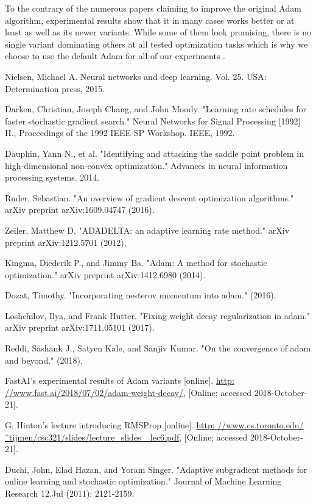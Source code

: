 \documentclass[12pt, titlepage]{article}
\begin{document}
To the contrary of the numerous papers claiming to improve the original Adam algorithm, experimental results show that it in many cases works better or at least as well as its newer variants. While some of them look promising, there is no single variant dominating others at all tested optimization tasks which is why we choose to use the default Adam for all of our experiments \cite{adam-variants}.



\begin{thebibliography}{0}
   Nielsen, Michael A. Neural networks and deep learning. Vol. 25. USA: Determination press, 2015.
  
   Darken, Christian, Joseph Chang, and John Moody. "Learning rate schedules for faster stochastic gradient search." Neural Networks for Signal Processing [1992] II., Proceedings of the 1992 IEEE-SP Workshop. IEEE, 1992.
  
   Dauphin, Yann N., et al. "Identifying and attacking the saddle point problem in high-dimensional non-convex optimization." Advances in neural information processing systems. 2014.
  
   Ruder, Sebastian. "An overview of gradient descent optimization algorithms." arXiv preprint arXiv:1609.04747 (2016).
  
   Zeiler, Matthew D. "ADADELTA: an adaptive learning rate method." arXiv preprint arXiv:1212.5701 (2012).
  
   Kingma, Diederik P., and Jimmy Ba. "Adam: A method for stochastic optimization." arXiv preprint arXiv:1412.6980 (2014).
  
   Dozat, Timothy. "Incorporating nesterov momentum into adam." (2016).
  
   Loshchilov, Ilya, and Frank Hutter. "Fixing weight decay regularization in adam." arXiv preprint arXiv:1711.05101 (2017).
  
   Reddi, Sashank J., Satyen Kale, and Sanjiv Kumar. "On the convergence of adam and beyond." (2018).
  
   FastAI’s experimental results of Adam variants [online]. \url{http:
//www.fast.ai/2018/07/02/adam-weight-decay/}, [Online; accessed
2018-October-21].

   G. Hinton’s lecture introducing RMSProp [online]. \url{http:
//www.cs.toronto.edu/˜tijmen/csc321/slides/lecture_slides_
lec6.pdf}, [Online; accessed 2018-October-21].

   Duchi, John, Elad Hazan, and Yoram Singer. "Adaptive subgradient methods for online learning and stochastic optimization." Journal of Machine Learning Research 12.Jul (2011): 2121-2159.


  
  
  
  
  \end{thebibliography}


 
\end{document}
